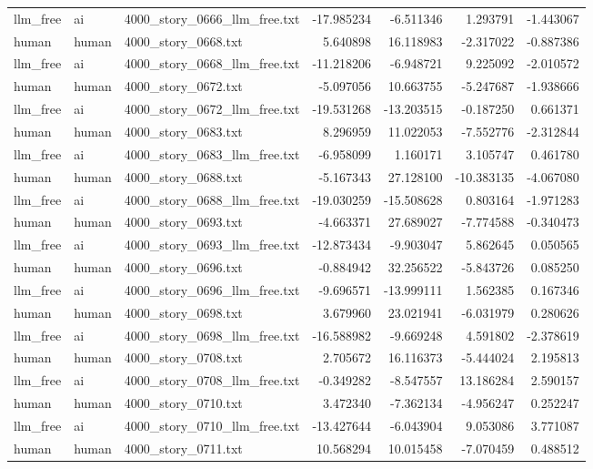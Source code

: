 \begin{longtable}{lllrrrr}
llm\_free & ai & 4000\_story\_0666\_llm\_free.txt & -17.985234 & -6.511346 & 1.293791 & -1.443067 \\
human & human & 4000\_story\_0668.txt & 5.640898 & 16.118983 & -2.317022 & -0.887386 \\
llm\_free & ai & 4000\_story\_0668\_llm\_free.txt & -11.218206 & -6.948721 & 9.225092 & -2.010572 \\
human & human & 4000\_story\_0672.txt & -5.097056 & 10.663755 & -5.247687 & -1.938666 \\
llm\_free & ai & 4000\_story\_0672\_llm\_free.txt & -19.531268 & -13.203515 & -0.187250 & 0.661371 \\
human & human & 4000\_story\_0683.txt & 8.296959 & 11.022053 & -7.552776 & -2.312844 \\
llm\_free & ai & 4000\_story\_0683\_llm\_free.txt & -6.958099 & 1.160171 & 3.105747 & 0.461780 \\
human & human & 4000\_story\_0688.txt & -5.167343 & 27.128100 & -10.383135 & -4.067080 \\
llm\_free & ai & 4000\_story\_0688\_llm\_free.txt & -19.030259 & -15.508628 & 0.803164 & -1.971283 \\
human & human & 4000\_story\_0693.txt & -4.663371 & 27.689027 & -7.774588 & -0.340473 \\
llm\_free & ai & 4000\_story\_0693\_llm\_free.txt & -12.873434 & -9.903047 & 5.862645 & 0.050565 \\
human & human & 4000\_story\_0696.txt & -0.884942 & 32.256522 & -5.843726 & 0.085250 \\
llm\_free & ai & 4000\_story\_0696\_llm\_free.txt & -9.696571 & -13.999111 & 1.562385 & 0.167346 \\
human & human & 4000\_story\_0698.txt & 3.679960 & 23.021941 & -6.031979 & 0.280626 \\
llm\_free & ai & 4000\_story\_0698\_llm\_free.txt & -16.588982 & -9.669248 & 4.591802 & -2.378619 \\
human & human & 4000\_story\_0708.txt & 2.705672 & 16.116373 & -5.444024 & 2.195813 \\
llm\_free & ai & 4000\_story\_0708\_llm\_free.txt & -0.349282 & -8.547557 & 13.186284 & 2.590157 \\
human & human & 4000\_story\_0710.txt & 3.472340 & -7.362134 & -4.956247 & 0.252247 \\
llm\_free & ai & 4000\_story\_0710\_llm\_free.txt & -13.427644 & -6.043904 & 9.053086 & 3.771087 \\
human & human & 4000\_story\_0711.txt & 10.568294 & 10.015458 & -7.070459 & 0.488512 \\

\end{longtable}
